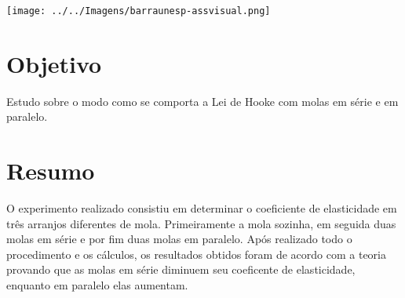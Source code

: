 \documentclass[
	12pt,				%
	oneside,			%
	a4paper,			%
	english,			%
	french,				%
	spanish,			%
	brazil,				%
	]{abntex2}
\begin{document}
\begin{minipage}[c][1.5cm][c]{3cm} %

\texttt{[image: ../../Imagens/barraunesp-assvisual.png]} 

\end{minipage}


\frenchspacing 


\imprimircapa


\tableofcontents*
\newpage

\section[Objetivo]{Objetivo}
\pagestyle{fancy}
Estudo sobre o modo como se comporta a Lei de Hooke com molas em série e em paralelo. 
\newpage
\section[Resumo]{Resumo}
\pagestyle{fancy}
O experimento realizado consistiu em determinar o coeficiente de elasticidade em três arranjos diferentes de mola. Primeiramente a mola sozinha, em seguida duas molas em série e por fim duas molas em paralelo. Após realizado todo o procedimento e os cálculos, os resultados obtidos foram de acordo com a teoria provando que as molas em série diminuem seu coeficente de elasticidade, enquanto em paralelo elas aumentam.

\end{document}
